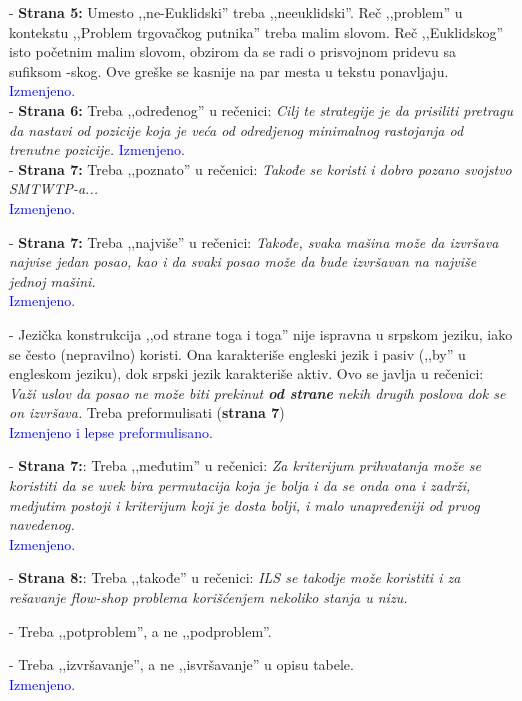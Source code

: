 \documentclass[a4paper]{report}
\newcommand{\odgovor}[1]{\textcolor{blue}{#1}}
\begin{document}
- \textbf{Strana 5:} Umesto ,,ne-Euklidski'' treba ,,neeuklidski''. Reč ,,problem'' u kontekstu ,,Problem trgovačkog putnika'' treba malim slovom. Reč ,,Euklidskog'' isto početnim malim slovom, obzirom da se radi o prisvojnom pridevu sa sufiksom -skog. Ove greške se kasnije na par mesta u tekstu ponavljaju.
\odgovor{Izmenjeno.\\}
- \textbf{Strana 6:} Treba ,,određenog'' u rečenici: {\em Cilj te strategije je da prisiliti pretragu da nastavi od pozicije koja je veća od odredjenog minimalnog rastojanja od trenutne pozicije.}
\odgovor{Izmenjeno.\\}
- \textbf{Strana 7:} Treba ,,poznato'' u rečenici: {\em Takođe se koristi i dobro pozano svojstvo SMTWTP-a...}\\
\odgovor{Izmenjeno.\\}

- \textbf{Strana 7:} Treba ,,najviše'' u rečenici: {\em Takođe, svaka mašina može da izvršava najvise jedan posao, kao i da svaki posao može da bude izvršavan na najviše jednoj mašini.}\\
\odgovor{Izmenjeno.\\}

- Jezička konstrukcija ,,od strane toga i toga'' nije ispravna u srpskom jeziku, iako se često (nepravilno) koristi. Ona karakteriše engleski jezik i pasiv (,,by'' u engleskom jeziku), dok srpski jezik karakteriše aktiv.
Ovo se javlja u rečenici: {\em Važi uslov da posao ne može biti prekinut \textbf{od strane} nekih drugih poslova dok se on izvršava.} Treba preformulisati (\textbf{strana 7})\\
\odgovor{Izmenjeno i lepse preformulisano.\\}

- \textbf{Strana 7:}: Treba ,,međutim'' u rečenici: {\em Za kriterijum prihvatanja može se koristiti da se uvek bira permutacija koja je bolja i da se onda ona i zadrži, medjutim postoji i kriterijum koji je dosta bolji, i malo unapređeniji od prvog navedenog.}\\
\odgovor{Izmenjeno.\\}

- \textbf{Strana 8:}: Treba ,,takođe'' u rečenici: {\em ILS se takodje može koristiti i za rešavanje flow-shop problema korišćenjem nekoliko stanja u nizu.}

- Treba ,,potproblem'', a ne ,,podproblem''.

- Treba ,,izvršavanje'', a ne ,,isvršavanje'' u opisu tabele.\\
\odgovor{Izmenjeno.\\}
\end{document}
